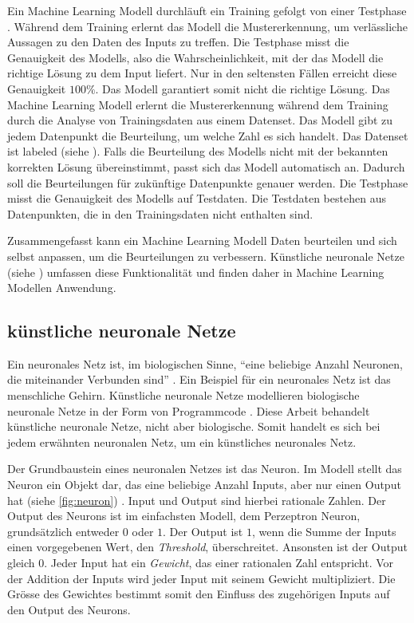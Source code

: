 Ein Machine Learning Modell durchläuft ein Training gefolgt von einer Testphase
\cite{noauthor_training_nodate}. Während dem Training erlernt das Modell die
Mustererkennung, um verlässliche Aussagen zu den Daten des Inputs zu treffen.
Die Testphase misst die Genauigkeit des Modells, also die Wahrscheinlichkeit,
mit der das Modell die richtige Lösung zu dem Input liefert. Nur in den seltensten
Fällen erreicht diese Genauigkeit $100\%$. Das Modell garantiert somit nicht die
richtige Lösung. Das Machine Learning Modell erlernt die Mustererkennung während
dem Training durch die Analyse von Trainingsdaten aus einem Datenset. Das Modell
gibt zu jedem Datenpunkt die Beurteilung, um welche Zahl es sich handelt. Das
Datenset ist labeled (siehe ). Falls die Beurteilung des
Modells nicht mit der bekannten korrekten Lösung übereinstimmt, passt sich das
Modell automatisch an. Dadurch soll die Beurteilungen für zukünftige Datenpunkte
genauer werden. Die Testphase misst die Genauigkeit des Modells auf Testdaten.
Die Testdaten bestehen aus Datenpunkten, die in den Trainingsdaten nicht
enthalten sind.
 
Zusammengefasst kann ein Machine Learning Modell Daten beurteilen und sich
selbst anpassen, um die Beurteilungen zu verbessern. Künstliche neuronale Netze
(siehe ) umfassen diese Funktionalität und finden daher in
Machine Learning Modellen Anwendung.
 
\subsection{künstliche neuronale Netze}\label{sub:t_ml_nn} Ein neuronales Netz
ist, im biologischen Sinne, ``eine beliebige Anzahl Neuronen, die miteinander
Verbunden sind'' \cite{noauthor_neuronales_2021}. Ein Beispiel für ein neuronales
Netz ist das menschliche Gehirn. Künstliche neuronale Netze modellieren
biologische neuronale Netze in der Form von Programmcode
\cite{noauthor_artificial_nodate}. Diese Arbeit behandelt künstliche neuronale
Netze, nicht aber biologische. Somit handelt es sich bei jedem erwähnten
neuronalen Netz, um ein künstliches neuronales Netz.
 
Der Grundbaustein eines neuronalen Netzes ist das Neuron. Im Modell stellt das
Neuron ein Objekt dar, das eine beliebige Anzahl Inputs, aber nur einen Output
hat (siehe \autoref{fig:neuron}) \cite{pramoditha_concept_2021}. Input und
Output sind hierbei rationale Zahlen. Der Output des Neurons ist im einfachsten
Modell, dem Perzeptron Neuron, grundsätzlich entweder $0$ oder $1$. Der Output ist
$1$, wenn die Summe der Inputs einen vorgegebenen Wert, den \emph{Threshold},
überschreitet. Ansonsten ist der Output gleich $0$. Jeder Input hat ein
\emph{Gewicht}, das einer rationalen Zahl entspricht. Vor der Addition der
Inputs wird jeder Input mit seinem Gewicht multipliziert. Die Grösse des
Gewichtes bestimmt somit den Einfluss des zugehörigen Inputs auf den Output des
Neurons. \cite{nielsen_neural_2015}\cite{simplilearn_what_2021}



